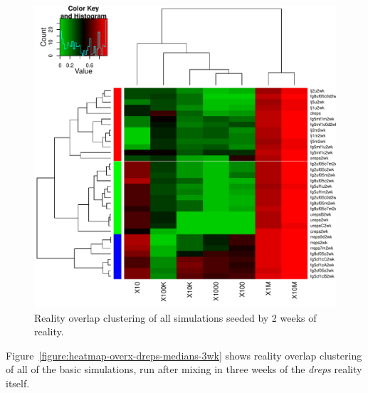\documentclass[10pt,oneside]{memoir}
\begin{document}
\begin{figure}
\begin{center}
    \includegraphics{figures/heatmap-overx-dreps-medians-2wk}
    \caption{Reality overlap clustering of all simulations seeded by 2 weeks of reality.}
    \label{figure:heatmap-overx-dreps-medians-2wk}
\end{center}
\end{figure}
Figure~\ref{figure:heatmap-overx-dreps-medians-3wk} shows reality overlap clustering of all of the basic simulations, run after mixing in three weeks of the {\itshape dreps} reality itself.
\end{document}
